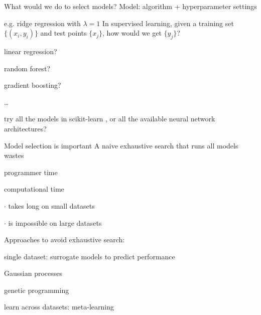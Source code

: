 \begin{frame}{What would we do to select models?}
Model: algorithm + hyperparameter settings

e.g. ridge regression with $\lambda = 1$
\vfill
In supervised learning, given a training set $ \{(x_i, y_i)\} $ and test points $ \{x_j\} $, how would we get $ \{y_j\} $?
\pause
\bit
\item linear regression?
\item random forest?
\item gradient boosting?
\item \dots
\item try all the models in scikit-learn \cite{scikit-learn}, or all the available neural network architectures?

\eit
\end{frame}

\begin{frame}{Model selection is important}
A naive exhaustive search that runs all models wastes
\bit
\item programmer time
\item computational time
\bit
\item[$\cdot$] takes long on small datasets
\item[$\cdot$] is impossible on large datasets
\eit
\eit

\vfill
Approaches to avoid exhaustive search:
\bit
\item single dataset: surrogate models to predict performance
\bit
\item Gaussian processes
\item genetic programming
\eit
\item learn across datasets: meta-learning
\eit

\end{frame}

